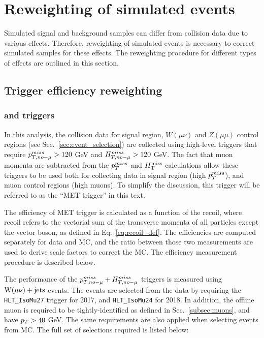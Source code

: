 \section{Reweighting of simulated events} \label{sec:reweighting}

\graphicspath{{3_DataAnalysisStrategy/Figures}}

Simulated signal and background samples can differ from collision data due to
various effects. Therefore, reweighting of simulated events is necessary to correct
simulated samples for these effects. The reweighting procedure for different types of 
effects are outlined in this section.

\subsection{Trigger efficiency reweighting}
\label{subsec:trigger_eff_reweighting}

\subsubsection{\ptmissnomu and \htmissnomu triggers}
\label{subsubsec:met_trigger_eff}

In this analysis, the collision data for signal region, $W(\mu \nu)$ and $Z(\mu \mu)$ 
control regions (see Sec.~\ref{sec:event_selection}) are collected using high-level triggers 
that require $p_{T,no-\mu}^{miss} > 120$ GeV
and $H_{T,no-\mu}^{miss} > 120$ GeV. The fact that muon momenta are subtracted
from the $p_T^{miss}$ and $H_{\mathrm{T}}^{\mathrm{miss}}$ calculations allow these triggers to be used both for collecting data in
signal region (high $p_T^{miss}$), and muon control regions (high \pt muons).
To simplify the discussion, this trigger will be referred to as the ``MET trigger'' in this text.

The efficiency of MET trigger is calculated as a function of the recoil, where recoil refers to
the vectorial sum of the transverse momenta of all particles except the vector boson, as defined in 
Eq.~\ref{eq:recoil_def}. The efficiencies are computed separately for data and MC,
and the ratio between those two measurements are used to derive scale factors to correct the MC.
The efficiency measurement procedure is described below.

The performance of the $p_{T,no-\mu}^{miss}+H_{T,no-\mu}^{miss}$ triggers is measured using $\mathrm{W}(\mu\nu)+\textrm{jets}$ events. The
events are selected from the data by requiring the \texttt{HLT\_IsoMu27} trigger for 2017, and \texttt{HLT\_IsoMu24} 
for 2018. In addition, the offline muon is required to be tightly-identified as defined in Sec.~\ref{subsec:muons}, 
and have $p_T > 40$ GeV. The same requirements are also applied when selecting events from MC.
The full set of selections required is listed below: 

